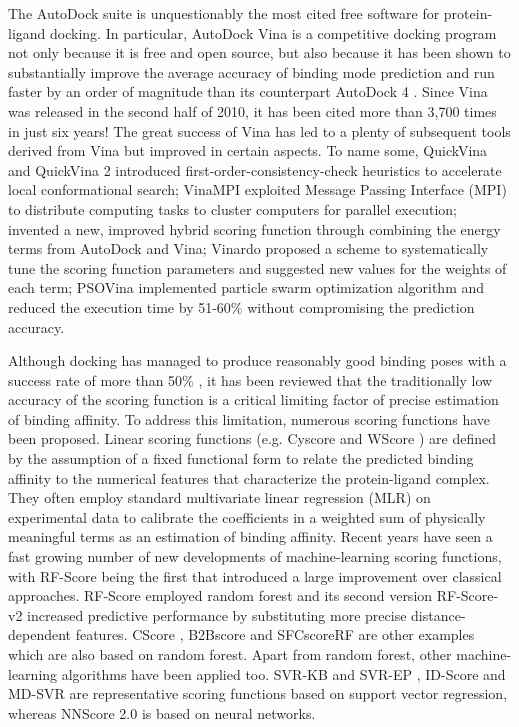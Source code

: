 \documentclass[a4paper,12pt]{article}
\begin{document}
The AutoDock suite \citep{1730} is unquestionably the most cited free software for protein-ligand docking. In particular, AutoDock Vina \citep{595} is a competitive docking program not only because it is free and open source, but also because it has been shown to substantially improve the average accuracy of binding mode prediction and run faster by an order of magnitude than its counterpart AutoDock 4 \citep{596}. Since Vina was released in the second half of 2010, it has been cited more than 3,700 times in just six years! The great success of Vina has led to a plenty of subsequent tools derived from Vina but improved in certain aspects. To name some, QuickVina \citep{1193} and QuickVina 2 \citep{1664} introduced first-order-consistency-check heuristics to accelerate local conformational search; VinaMPI \citep{1329} exploited Message Passing Interface (MPI) to distribute computing tasks to cluster computers for parallel execution; \citeauthor{1716} \citep{1716} invented a new, improved hybrid scoring function through combining the energy terms from AutoDock and Vina; Vinardo \citep{1741} proposed a scheme to systematically tune the scoring function parameters and suggested new values for the weights of each term; PSOVina \citep{1789} implemented particle swarm optimization algorithm and reduced the execution time by 51-60\% without compromising the prediction accuracy.

Although docking has managed to produce reasonably good binding poses with a success rate of more than 50\% \citep{1362}, it has been reviewed \citep{1695} that the traditionally low accuracy of the scoring function is a critical limiting factor of precise estimation of binding affinity. To address this limitation, numerous scoring functions have been proposed. Linear scoring functions (e.g. Cyscore \citep{1372} and WScore \citep{1736}) are defined by the assumption of a fixed functional form to relate the predicted binding affinity to the numerical features that characterize the protein-ligand complex. They often employ standard multivariate linear regression (MLR) on experimental data to calibrate the coefficients in a weighted sum of physically meaningful terms as an estimation of binding affinity. Recent years have seen a fast growing number of new developments of machine-learning scoring functions, with RF-Score \citep{564} being the first that introduced a large improvement over classical approaches. RF-Score employed random forest and its second version RF-Score-v2 \citep{1370} increased predictive performance by substituting more precise distance-dependent features. CScore \citep{1194}, B2Bscore \citep{1410} and SFCscoreRF \citep{1347} are other examples which are also based on random forest. Apart from random forest, other machine-learning algorithms have been applied too. SVR-KB and SVR-EP \citep{963}, ID-Score \citep{1305} and MD-SVR \citep{1452} are representative scoring functions based on support vector regression, whereas NNScore 2.0 \citep{977} is based on neural networks.
\end{document}
